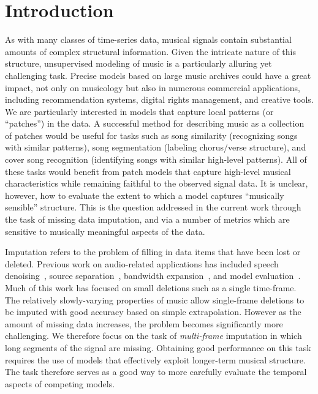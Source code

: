 \documentclass{article}
\newcommand{\FIXME}[2][FIXME]{}%
\begin{document}
\section{Introduction}
\label{sec:intro}
As with many classes of time-series data, musical signals contain
substantial amounts of complex structural information.  Given the
intricate nature of this structure, unsupervised modeling of music 
is a particularly alluring yet challenging task.  
Precise models based on large music archives could have a 
great impact, not only on musicology but also in numerous commercial 
applications, including recommendation systems,
digital rights management, and creative tools.  %
We are particularly interested in models that capture local patterns
(or ``patches'') in the data.  
A successful method for describing music as a collection of patches 
would be useful for tasks such as song similarity (recognizing songs
with similar patterns), song segmentation (labeling chorus/verse
structure), and cover song recognition (identifying songs with similar
high-level patterns).  All of these tasks would benefit from patch
models that capture high-level musical characteristics while remaining
faithful to the observed signal data.
It is unclear, however, how to evaluate the extent to which a model 
captures ``musically sensible'' structure.  This is the question 
addressed in the current work through the task of missing 
data imputation, and via a number of metrics which are sensitive to musically
meaningful aspects of the data.

Imputation refers to the problem of filling in
data items that have been lost or deleted.  
Previous work on audio-related applications has
included speech denoising~\cite{Cooke1996,Raj1998}, source
separation~\cite{Reyes-Gomez2005}, bandwidth
expansion~\cite{Smaragdis2009}, and model
evaluation~\cite{Hoffman2010}.  Much of this work has 
focused on small deletions such as a single time-frame.
The relatively slowly-varying properties of music allow 
single-frame deletions to be imputed with good accuracy based 
on simple extrapolation.
However as the amount of missing data increases, the problem
becomes significantly more challenging.
%
We therefore focus on the task of \emph{multi-frame} imputation in
which long segments of the signal are missing.
%
Obtaining good performance on this task requires the use of models
that effectively exploit longer-term musical structure.  The task 
therefore serves as a good way to
more carefully evaluate the temporal aspects of competing
models.  %
\end{document}
